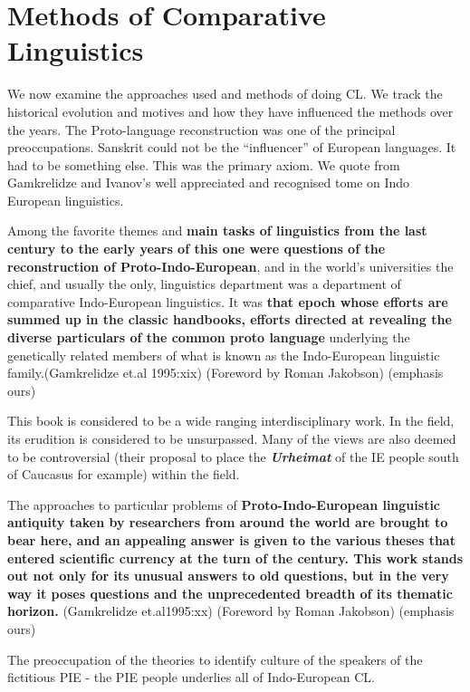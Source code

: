 \section*{Methods of Comparative Linguistics}

We now examine the approaches used and methods of doing CL. We track the historical evolution and motives and how they have influenced the methods over the years. The Proto-language reconstruction was one of the principal preoccupations. Sanskrit could not be the “influencer” of European languages. It had to be something else. This was the primary axiom. We quote from Gamkrelidze and Ivanov’s well appreciated and recognised tome on Indo European linguistics.

\begin{myquote}
Among the favorite themes and \textbf{main tasks of linguistics from the last century to the early years of this one were questions of the reconstruction of Proto-Indo-European}, and in the world's universities the chief, and usually the only, linguistics department was a department of comparative Indo-European linguistics. It was \textbf{that epoch whose efforts are summed up in the classic handbooks, efforts directed at revealing the diverse particulars of the common proto language} underlying the genetically related members of what is known as the Indo-European linguistic family.(Gamkrelidze et.al 1995:xix) (Foreword by Roman Jakobson) (emphasis ours)
\end{myquote}

This book is considered to be a wide ranging interdisciplinary work. In the field, its erudition is considered to be unsurpassed. Many of the views are also deemed to be controversial (their proposal to place the \textbf{\textit{Urheimat}} of the IE people south of Caucasus for example) within the field.

\begin{myquote}
The approaches to particular problems of \textbf{Proto-Indo-European linguistic antiquity taken by researchers from around the world are brought to bear here, and an appealing answer is given to the various theses that entered scientific currency at the turn of the century. This work stands out not only for its unusual answers to old questions, but in the very way it poses questions and the unprecedented breadth of its thematic horizon.} (Gamkrelidze et.al1995:xx) (Foreword by Roman Jakobson) (emphasis ours)
\end{myquote}

The preoccupation of the theories to identify culture of the speakers of the fictitious PIE - the PIE people underlies all of Indo-European CL.

